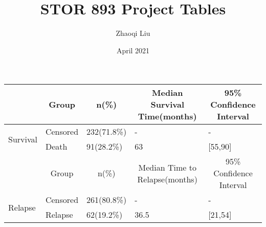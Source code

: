 \documentclass{article}
\title{STOR 893 Project Tables}
\author{Zhaoqi Liu }
\date{April 2021}
\begin{document}
\maketitle



\begin{table}[h]
\begin{tabular}{l c c c c}  %
\hline\hline %
 & Group & n(\%) &Median Survival Time(months) & 95\% Confidence Interval 
 \\ [0.5ex]   
\hline             %
\multirow{2}{*}{Survival} 
& \multicolumn{1}{l}{\hfil Censored} 
& \multicolumn{1}{l}{\hfil232(71.8\%)}
& \multicolumn{1}{l}{\hfil -}
& \multicolumn{1}{l}{\hfil -}
\\\cline{4-5}
& \multicolumn{1}{l}{\hfil Death} 
& \multicolumn{1}{l}{\hfil91(28.2\%)}
& \multicolumn{1}{l}{\hfil63}
& \multicolumn{1}{l}{\hfil[55,90]}
\\\hline
 & Group  & n(\%) &Median Time to Relapse(months) & 95\% Confidence Interval 
\\\hline
\multirow{2}{*}{Relapse} 
& \multicolumn{1}{l}{\hfil Censored} 
& \multicolumn{1}{l}{\hfil261(80.8\%)}
& \multicolumn{1}{l}{\hfil -}
& \multicolumn{1}{l}{\hfil -}
\\\cline{4-5}
& \multicolumn{1}{l}{\hfil Relapse} 
& \multicolumn{1}{l}{\hfil62(19.2\%)}
& \multicolumn{1}{l}{\hfil36.5}
& \multicolumn{1}{l}{\hfil[21,54]}
\\\hline
\end{tabular}
\end{table}


\begin{table}[]
\centering
{}
\end{table}
\end{document}

